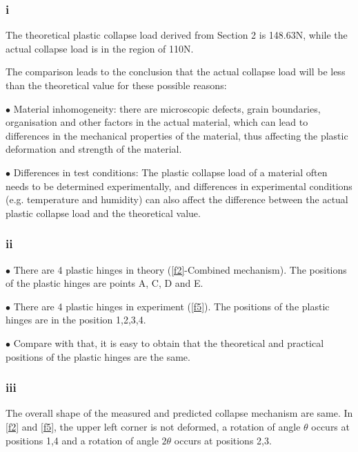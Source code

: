 \subsubsection*{i}

The theoretical plastic collapse load derived from Section 2 is 148.63N, while the actual collapse load is in the region of 110N.

The comparison leads to the conclusion that the actual collapse load will be less than the theoretical value for these possible reasons:

$\bullet$ Material inhomogeneity: there are microscopic defects, grain boundaries, organisation and other factors in the actual material, which can lead to differences in the mechanical properties of the material, thus affecting the plastic deformation and strength of the material.

$\bullet$ Differences in test conditions: The plastic collapse load of a material often needs to be determined experimentally, and differences in experimental conditions (e.g. temperature and humidity) can also affect the difference between the actual plastic collapse load and the theoretical value.

\subsubsection*{ii}

$\bullet$ There are 4 plastic hinges in theory (\autoref{f2}-Combined mechanism). The positions of the plastic hinges are points A, C, D and E.

$\bullet$ There are 4 plastic hinges in experiment (\autoref{f5}). The positions of the plastic hinges are in the position 1,2,3,4.

$\bullet$ Compare with that, it is easy to obtain that the theoretical and practical positions of the plastic hinges are the same.

\subsubsection*{iii}

The overall shape of the measured and predicted collapse mechanism are same. In \autoref{f2} and \autoref{f5}, the upper left corner is not deformed, a rotation of angle $\theta$ occurs at positions 1,4 and a rotation of angle $2\theta$ occurs at positions 2,3.